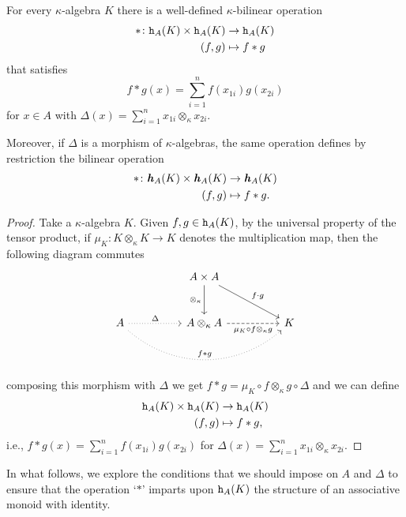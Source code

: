 \begin{prop}
    For every\/ $\kappa$-algebra\/ $K$ there is a well-defined\/ $\kappa$-bilinear operation
    \begin{align*}
        *\colon\mathtt h_A(K)\times\mathtt h_A(K)&\to\mathtt h_A(K)\\
            (f,g)&\mapsto f*g
    \end{align*}
    that satisfies
    $$
        f*g(x)=\sum_{i=1}^n f(x_{1i})g(x_{2i})
    $$
    for\/ $x\in A$ with\/ $\Delta(x)=\sum_{i=1}^nx_{1i}\otimes_\kappa x_{2i}$.

    Moreover, if\/ $\Delta$ is a morphism of\/ $\kappa$-algebras, the same operation defines by restriction the bilinear operation
    \begin{align*}
        *\colon\textrm{\boldmath$\mathit h$}_A(K)\times\textrm{\boldmath$\mathit h$}_A(K)&\to\textrm{\boldmath$\mathit h$}_A(K)\\
            (f,g)&\mapsto f*g.
    \end{align*}
\end{prop}

\begin{proof}
    Take a $\kappa$-algebra $K$. Given $f,g\in\mathtt h_A(K)$, by the universal property of the tensor product, if $\mu_K\colon K\otimes_\kappa K\to K$ denotes the multiplication map, then the following diagram commutes
    \small
    $$
        \begin{tikzcd}[row sep=large,column sep=huge]
                &A\times A
                        \arrow[rd,"f\cdot g"]
                        \arrow[d,"\otimes_\kappa"']\\
            A
                    \arrow[r,dotted,"\Delta"]
                    \arrow[rr,bend right=41,dotted,"f*g"]
                &A\otimes_\kappa A
                        \arrow[r,"\mu_K\circ f\otimes_\kappa g"',dashed]
                    &K
        \end{tikzcd}
    $$
    \normalsize
    composing this morphism with $\Delta$ we get $f*g= \mu_K\circ f\otimes_\kappa g\circ\Delta$ and we can define
    \begin{align*}
        \mathtt h_A(K)\times\mathtt h_A(K)&\to\mathtt h_A(K)\\
            (f,g)&\mapsto f*g,
    \end{align*}
    i.e., $f*g(x)=\sum_{i=1}^n f(x_{1i})g(x_{2i})$ for $\Delta(x)=\sum_{i=1}^nx_{1i}\otimes_\kappa x_{2i}$.
\end{proof}

In what follows, we explore the conditions that we should impose on $A$ and $\Delta$ to ensure that the operation `$*$' imparts upon $\mathtt h_A(K)$ the structure of an associative monoid with identity.

